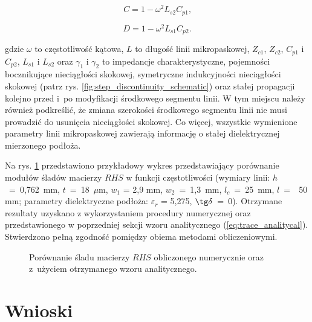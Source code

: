 \begin{equation}
    C = 1 - \omega^2L_{s2}C_{p1} \text{,}
\end{equation}

\begin{equation}
    D = 1 - \omega^2L_{s1}C_{p2} \text{.}
\end{equation}



\noindent gdzie $\omega$ to częstotliwość kątowa, $L$ to długość linii mikropaskowej, $Z_{c1}$, $Z_{c2}$, $C_{p1}$ i $C_{p2}$, $L_{s1}$ i $L_{s2}$ oraz $\gamma_1$ i $\gamma_2$ to impedancje charakterystyczne, pojemności bocznikujące nieciągłości skokowej, symetryczne indukcyjności nieciągłości skokowej (patrz rys. \ref{fig:step_discontinuity_schematic}) oraz stałej propagacji kolejno przed i~po modyfikacji środkowego segmentu linii. W tym miejscu należy również podkreślić, że zmiana szerokości środkowego segmentu linii nie musi prowadzić do usunięcia nieciągłości skokowej. Co więcej, wszystkie wymienione parametry linii mikropaskowej zawierają informację o stałej dielektrycznej mierzonego podłoża.
\par Na rys. \ref{fig:trace_analytical} przedstawiono przykładowy wykres przedstawiający porównanie modułów śladów macierzy $RHS$ w funkcji częstotliwości (wymiary linii: $h$~=~0,762~mm, $t$~=~18~$\mu \text{m}$, $w_1$ = 2,9 mm, $w_2$~=~1,3~mm, $l_c$~=~25~mm, $l$~=~~50 mm; parametry dielektryczne podłoża: $\varepsilon_r$ = 5,275, $\tg\delta$~=~0). Otrzymane rezultaty uzyskano z wykorzystaniem procedury numerycznej oraz przedstawionego w poprzedniej sekcji wzoru analitycznego (\ref{eq:trace_analitycal}). Stwierdzono pełną zgodność pomiędzy obiema metodami obliczeniowymi.

\begin{figure}[tbh]
   \centerline{}
    \caption{Porównanie śladu macierzy $RHS$ obliczonego numerycznie oraz z~użyciem otrzymanego wzoru analitycznego.}
\label{fig:trace_analytical}
\end{figure}

\section{Wnioski}

